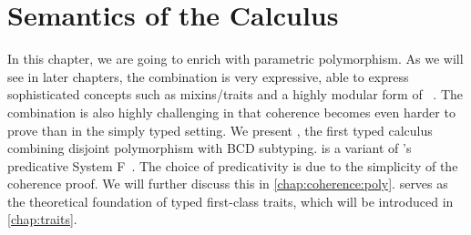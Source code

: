 
\chapter{Semantics of the \fnamee Calculus}
\label{chap:fi}

In this chapter, we are going to enrich \namee with parametric polymorphism. As
we will see in later chapters, the combination is very expressive, able to express sophisticated
concepts such as mixins/traits and a highly modular form of \visitor~\citep{oliveira09modular, togersen:2004}. The
combination is also highly challenging in that coherence becomes even harder to
prove than in the simply typed setting. We present \fnamee, the first typed
calculus combining disjoint polymorphism with BCD subtyping. \fnamee is a
variant of \citeauthor{leivant1991finitely}'s predicative System
F~\citep{leivant1991finitely}. The choice of predicativity is due to the
simplicity of the coherence proof. We will further discuss this in
\cref{chap:coherence:poly}. \fnamee serves as the theoretical foundation of
typed first-class traits, which will be introduced in \cref{chap:traits}.












